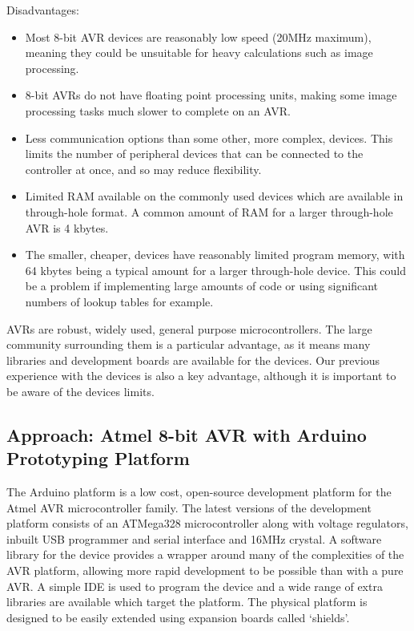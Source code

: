 Disadvantages:
\begin{itemize}
\item Most 8-bit AVR devices are reasonably low speed (20MHz maximum), meaning they could be unsuitable for heavy calculations such as image processing.

\item 8-bit AVRs do not have floating point processing units, making some image processing tasks much slower to complete on an AVR.

\item Less communication options than some other, more complex, devices. This limits the number of peripheral devices that can be connected to the controller at once, and so may reduce flexibility.

\item Limited RAM available on the commonly used devices which are available in through-hole format. A common amount of RAM for a larger through-hole AVR is 4 kbytes.

\item The smaller, cheaper, devices have reasonably limited program memory, with 64 kbytes being a typical amount for a larger through-hole device. This could be a problem if implementing large amounts of code or using significant numbers of lookup tables for example.
\end{itemize}
	
AVRs are robust, widely used, general purpose microcontrollers. The large community surrounding them is a particular advantage, as it means many libraries and development boards are available for the devices. Our previous experience with the devices is also a key advantage, although it is important to be aware of the devices limits.


\subsection{Approach: Atmel 8-bit AVR with Arduino Prototyping Platform}
\label{sec:appr_considered_arduino}

The Arduino platform is a low cost, open-source development platform for the Atmel AVR microcontroller family. The latest versions of the development platform consists of an ATMega328 microcontroller along with voltage regulators, inbuilt USB programmer and serial interface and 16MHz crystal. A software library for the device provides a wrapper around many of the complexities of the AVR platform, allowing more rapid development to be possible than with a pure AVR. A simple IDE is used to program the device and a wide range of extra libraries are available which target the platform. The physical platform is designed to be easily extended using expansion boards called `shields'.


